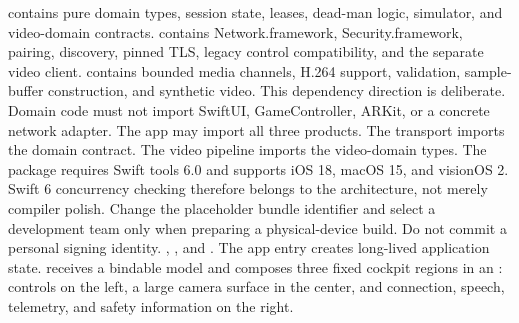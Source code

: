 {}\markdownRendererUlBegin
\markdownRendererUlItem {} contains pure domain types, session state, leases, dead-man logic, simulator, and video-domain contracts.\markdownRendererUlItemEnd 
\markdownRendererUlItem {} contains Network.framework, Security.framework, pairing, discovery, pinned TLS, legacy control compatibility, and the separate video client.\markdownRendererUlItemEnd 
\markdownRendererUlItem {} contains bounded media channels, H.264 support, validation, sample-buffer construction, and synthetic video.\markdownRendererUlItemEnd 
\markdownRendererUlEnd \markdownRendererInterblockSeparator
{}This dependency direction is deliberate. Domain code must not import SwiftUI, GameController, ARKit, or a concrete network adapter. The app may import all three products. The transport imports the domain contract. The video pipeline imports the video-domain types.\markdownRendererParagraphSeparator
{}The package requires Swift tools 6.0 and supports iOS 18, macOS 15, and visionOS 2. Swift 6 concurrency checking therefore belongs to the architecture, not merely compiler polish.\markdownRendererInterblockSeparator
{}\markdownRendererSectionBegin
{}\markdownRendererInterblockSeparator
{}\markdownRendererInterblockSeparator
{}Change the placeholder bundle identifier and select a development team only when preparing a physical-device build. Do not commit a personal signing identity.\markdownRendererInterblockSeparator
{}
\markdownRendererSectionEnd 
\markdownRendererSectionEnd \markdownRendererSectionBegin
{}\markdownRendererInterblockSeparator
{}\markdownRendererBlockQuoteBegin
{} , , and .\markdownRendererBlockQuoteEnd \markdownRendererInterblockSeparator
{}The app entry creates long-lived application state.  receives a bindable model and composes three fixed cockpit regions in an : controls on the left, a large camera surface in the center, and connection, speech, telemetry, and safety information on the right.\markdownRendererParagraphSeparator
